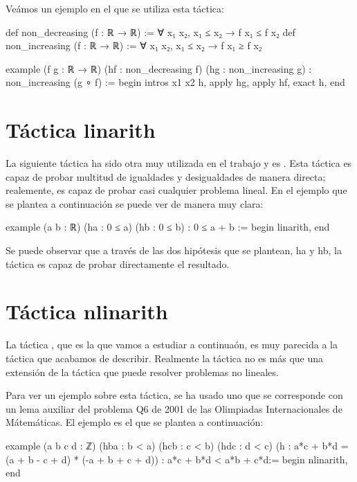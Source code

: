 Veámos un ejemplo en el que se utiliza esta táctica:
\begin{leancode}
def non_decreasing (f : ℝ → ℝ) := ∀ x₁ x₂, x₁ ≤ x₂ → f x₁ ≤ f x₂
def non_increasing (f : ℝ → ℝ) := ∀ x₁ x₂, x₁ ≤ x₂ → f x₁ ≥ f x₂

example (f g : ℝ → ℝ) (hf : non_decreasing f) (hg : non_increasing g) :
non_increasing (g ∘ f) :=
begin
  intros x1 x2 h,
  apply hg,
  apply hf,
  exact h,
end
\end{leancode}

\section{Táctica linarith}

La siguiente táctica ha sido otra muy utilizada en el trabajo y es
. Esta táctica es capaz de probar multitud
de igualdades y desigualdades de manera directa; realemente, es capaz de
probar casi cualquier problema lineal. En el ejemplo que se plantea a
continuación se puede ver de manera muy clara:

\begin{leancode}
example (a b : ℝ) (ha : 0 ≤ a) (hb : 0 ≤ b) : 0 ≤ a + b :=
begin
  linarith,
end
\end{leancode}

Se puede observar que a través de las dos hipótesis que se plantean, ha
y hb, la táctica  es capaz de probar
directamente el resultado.

\section{Táctica nlinarith}

La táctica , que es la que vamos a
estudiar a continuaón, es muy parecida a la táctica
 que acabamos de describir. Realmente la
táctica  no es más que una extensión de
la táctica  que puede resolver problemas no
lineales.

Para ver un ejemplo sobre esta táctica, se ha usado uno que se
corresponde con un lema auxiliar del problema Q6 de 2001 de las
Olimpiadas Internacionales de Mátemáticas. El ejemplo es el que se
plantea a continuación:

\begin{leancode}
example (a b c d : ℤ)
  (hba : b < a)
  (hcb : c < b)
  (hdc : d < c)
  (h : a*c + b*d = (a + b - c + d) * (-a + b + c + d))
  : a*c + b*d < a*b + c*d:=
begin
  nlinarith,
end
\end{leancode}

